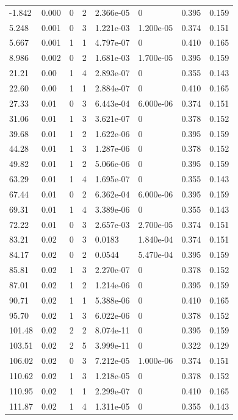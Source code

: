 \documentclass[preview]{standalone}
\begin{document}
{{\begin{tabular}{L{1.2cm}C{1.2cm} C{0.3cm}C{0.5cm} C{1.4cm}C{1.4cm} C{1.4cm}C{1.4cm}}
  -1.842  &  0.000  & 0     &  2 &  2.366e-05  & 0  & 0.395 &  0.159   \\ 
  5.248  &  0.001  & 0     &  3 &  1.221e-03  & 1.200e-05  & 0.374 &  0.151   \\ 
  5.667  &  0.001  & 1     &  1 &  4.797e-07  & 0  & 0.410 &  0.165   \\ 
  8.986  &  0.002  & 0     &  2 &  1.681e-03  & 1.700e-05  & 0.395 &  0.159   \\ 
  21.21  &  0.00  & 1     &  4 &  2.893e-07  & 0  & 0.355 &  0.143   \\ 
  22.60  &  0.00  & 1     &  1 &  2.884e-07  & 0  & 0.410 &  0.165   \\ 
  27.33  &  0.01  & 0     &  3 &  6.443e-04  & 6.000e-06  & 0.374 &  0.151   \\ 
  31.06  &  0.01  & 1     &  3 &  3.621e-07  & 0  & 0.378 &  0.152   \\ 
  39.68  &  0.01  & 1     &  2 &  1.622e-06  & 0  & 0.395 &  0.159   \\ 
  44.28  &  0.01  & 1     &  3 &  1.287e-06  & 0  & 0.378 &  0.152   \\ 
  49.82  &  0.01  & 1     &  2 &  5.066e-06  & 0  & 0.395 &  0.159   \\ 
  63.29  &  0.01  & 1     &  4 &  1.695e-07  & 0  & 0.355 &  0.143   \\ 
  67.44  &  0.01  & 0     &  2 &  6.362e-04  & 6.000e-06  & 0.395 &  0.159   \\ 
  69.31  &  0.01  & 1     &  4 &  3.389e-06  & 0  & 0.355 &  0.143   \\ 
  72.22  &  0.01  & 0     &  3 &  2.657e-03  & 2.700e-05  & 0.374 &  0.151   \\ 
  83.21  &  0.02  & 0     &  3 &  0.0183  & 1.840e-04  & 0.374 &  0.151   \\ 
  84.17  &  0.02  & 0     &  2 &  0.0544  & 5.470e-04  & 0.395 &  0.159   \\ 
  85.81  &  0.02  & 1     &  3 &  2.270e-07  & 0  & 0.378 &  0.152   \\ 
  87.01  &  0.02  & 1     &  2 &  1.214e-06  & 0  & 0.395 &  0.159   \\ 
  90.71  &  0.02  & 1     &  1 &  5.388e-06  & 0  & 0.410 &  0.165   \\ 
  95.70  &  0.02  & 1     &  3 &  6.022e-06  & 0  & 0.378 &  0.152   \\ 
  101.48  &  0.02  & 2     &  2 &  8.074e-11  & 0  & 0.395 &  0.159   \\ 
  103.51  &  0.02  & 2     &  5 &  3.999e-11  & 0  & 0.322 &  0.129   \\ 
  106.02  &  0.02  & 0     &  3 &  7.212e-05  & 1.000e-06  & 0.374 &  0.151   \\ 
  110.62  &  0.02  & 1     &  3 &  1.218e-05  & 0  & 0.378 &  0.152   \\ 
  110.95  &  0.02  & 1     &  1 &  2.299e-07  & 0  & 0.410 &  0.165   \\ 
  111.87  &  0.02  & 1     &  4 &  1.311e-05  & 0  & 0.355 &  0.143   \\ 
\hline 
\end{tabular} 

}}
\end{document}
